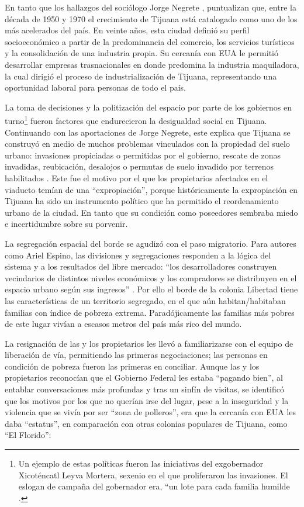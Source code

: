 \documentclass[
  spanish,
  11pt,
  a4paper,
]{scrbook}
\begin{document}
En tanto que los hallazgos del sociólogo Jorge Negrete
\autocite{Mata1993}, puntualizan que, entre la década de 1950 y 1970 el
crecimiento de Tijuana está catalogado como uno de los más acelerados
del país. En veinte años, esta ciudad definió su perfil socioeconómico a
partir de la predominancia del comercio, los servicios turísticos y la
consolidación de una industria propia. Su cercanía con EUA le permitió
desarrollar empresas trasnacionales en donde predomina la industria
maquiladora, la cual dirigió el proceso de industrialización de Tijuana,
representando una oportunidad laboral para personas de todo el país.

La toma de decisiones y la politización del espacio por parte de los
gobiernos en turno\footnote{Un ejemplo de estas políticas fueron las
  iniciativas del exgobernador Xicoténcatl Leyva Mortera, sexenio en el
  que proliferaron las invasiones. El eslogan de campaña del gobernador
  era, ``un lote para cada familia humilde \autocite{Mata1993}.} fueron
factores que endurecieron la desigualdad social en Tijuana. Continuando
con las aportaciones de Jorge Negrete, este explica que Tijuana se
construyó en medio de muchos problemas vinculados con la propiedad del
suelo urbano: invasiones propiciadas o permitidas por el gobierno,
rescate de zonas invadidas, reubicación, desalojos o permutas de suelo
invadido por terrenos habilitados \autocite{Mata1993}. Este fue el
motivo por el que los propietarios afectados en el viaducto temían de
una ``expropiación'', porque históricamente la expropiación en Tijuana
ha sido un instrumento político que ha permitido el reordenamiento
urbano de la ciudad. En tanto que su condición como poseedores sembraba
miedo e incertidumbre sobre su porvenir.

La segregación espacial del borde se agudizó con el paso migratorio.
Para autores como Ariel Espino, las divisiones y segregaciones responden
a la lógica del sistema y a los resultados del libre mercado: ``los
desarrolladores construyen vecindarios de distintos niveles económicos y
los compradores se distribuyen en el espacio urbano según sus ingresos''
\autocite{Mendez2018}. Por ello el borde de la colonia Libertad tiene
las características de un territorio segregado, en el que aún
habitan/habitaban familias con índice de pobreza extrema.
Paradójicamente las familias más pobres de este lugar vivían a escasos
metros del país más rico del mundo.

La resignación de las y los propietarios les llevó a familiarizarse con
el equipo de liberación de vía, permitiendo las primeras negociaciones;
las personas en condición de pobreza fueron las primeras en conciliar.
Aunque las y los propietarios reconocían que el Gobierno Federal les
estaba ``pagando bien'', al entablar conversaciones más profundas y tras
un sinfín de visitas, se identificó que los motivos por los que no
querían irse del lugar, pese a la inseguridad y la violencia que se
vivía por ser ``zona de polleros'', era que la cercanía con EUA les daba
``estatus'', en comparación con otras colonias populares de Tijuana,
como ``El Florido'':
\end{document}
